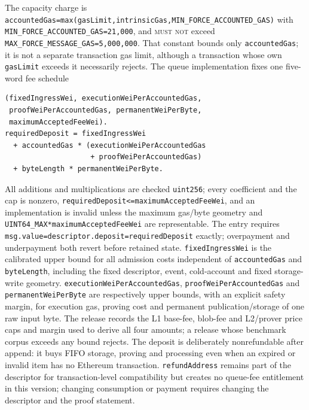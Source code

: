 \documentclass[a4paper,11pt]{article}
\newcommand{\code}[1]{\nolinkurl{#1}}
\newcommand{\mustnot}{\textsc{must not}}
\begin{document}
The capacity charge is
\code{accountedGas=max(gasLimit,intrinsicGas,MIN_FORCE_ACCOUNTED_GAS)} with
\code{MIN_FORCE_ACCOUNTED_GAS=21,000}, and \mustnot{} exceed
\code{MAX_FORCE_MESSAGE_GAS=5,000,000}.  That constant bounds only
\code{accountedGas}; it is not a separate transaction gas limit, although a
transaction whose own \code{gasLimit} exceeds it necessarily rejects.  The
queue implementation fixes one five-word fee schedule
\begin{verbatim}
(fixedIngressWei, executionWeiPerAccountedGas,
 proofWeiPerAccountedGas, permanentWeiPerByte,
 maximumAcceptedFeeWei).
requiredDeposit = fixedIngressWei
  + accountedGas * (executionWeiPerAccountedGas
                    + proofWeiPerAccountedGas)
  + byteLength * permanentWeiPerByte.
\end{verbatim}
All additions and multiplications are checked \code{uint256}; every
coefficient and the cap is nonzero,
\code{requiredDeposit<=maximumAcceptedFeeWei}, and an implementation is
invalid unless the maximum gas/byte geometry and
\code{UINT64_MAX*maximumAcceptedFeeWei} are representable.  The entry
requires \code{msg.value=descriptor.deposit=requiredDeposit} exactly;
overpayment and underpayment both revert before retained state.
\code{fixedIngressWei} is the calibrated upper bound for all admission costs
independent of \code{accountedGas} and \code{byteLength}, including the fixed
descriptor, event, cold-account and fixed storage-write geometry.
\code{executionWeiPerAccountedGas}, \code{proofWeiPerAccountedGas} and
\code{permanentWeiPerByte} are respectively upper bounds, with an explicit
safety margin, for execution gas, proving cost and permanent
publication/storage of one raw input byte.  The release records the L1
base-fee, blob-fee and L2/prover price caps and margin used to derive all
four amounts; a release whose benchmark corpus exceeds any bound rejects.
The deposit is deliberately nonrefundable after append: it buys FIFO
storage, proving and processing even when an expired or invalid item has no
Ethereum transaction.  \code{refundAddress} remains part of the descriptor
for transaction-level compatibility but creates no queue-fee entitlement in
this version; changing consumption or payment requires changing the
descriptor and the proof statement.
\end{document}
